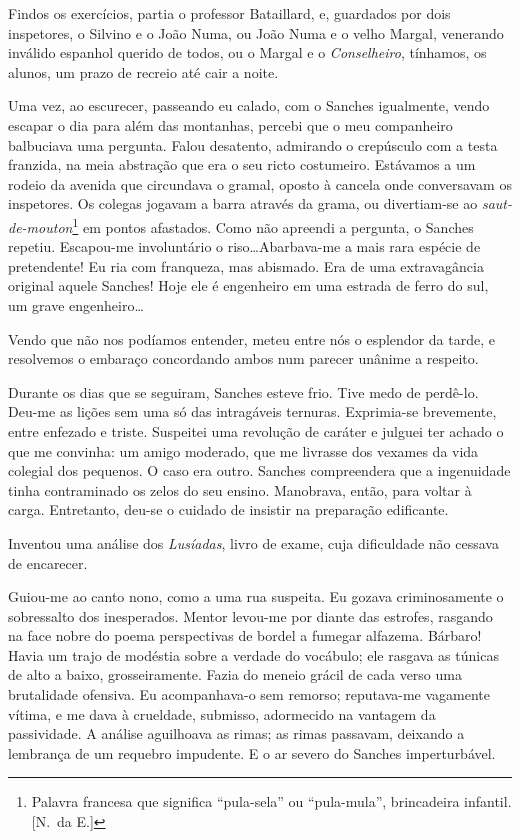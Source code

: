 Findos os exercícios, partia o professor
Bataillard, e, guardados por dois inspetores, o Silvino e o João Numa,
ou João Numa e o velho Margal, venerando inválido espanhol querido de
todos, ou o Margal e o \textit{Conselheiro}, tínhamos, os alunos, um prazo de
recreio até cair a noite. 

Uma vez, ao escurecer, passeando eu calado,
com o Sanches igualmente, vendo escapar o dia para além das montanhas,
percebi que o meu companheiro balbuciava uma pergunta. Falou desatento,
admirando o crepúsculo com a testa franzida, na meia abstração que era
o seu ricto costumeiro. Estávamos a um rodeio da avenida que circundava
o gramal, oposto à cancela onde conversavam os inspetores. Os colegas
jogavam a barra através da grama, ou divertiam{}-se ao
\textit{saut{}-de{}-mouton}\footnote{ Palavra francesa que significa 
``pula-sela'' ou ``pula-mula'', brincadeira infantil. [N.~da E.]} 
em pontos afastados. Como não apreendi a pergunta, o
Sanches repetiu. Escapou{}-me involuntário o riso\ldots Abarbava{}-me a
mais rara espécie de pretendente! Eu ria com franqueza, mas abismado.
Era de uma extravagância original aquele Sanches! Hoje ele é engenheiro
em uma estrada de ferro do sul, um grave engenheiro\ldots 

Vendo que não nos podíamos entender, meteu entre nós o esplendor da tarde, e
resolvemos o embaraço concordando ambos num parecer unânime a respeito.

Durante os dias que se seguiram, Sanches esteve frio. Tive medo de
perdê{}-lo. Deu{}-me as lições sem uma só das intragáveis ternuras.
Exprimia{}-se brevemente, entre enfezado e triste. Suspeitei uma
revolução de caráter e julguei ter achado o que me convinha: um amigo
moderado, que me livrasse dos vexames da vida colegial dos pequenos. O
caso era outro. Sanches compreendera que a ingenuidade tinha
contraminado os zelos do seu ensino. Manobrava, então, para voltar à
carga. Entretanto, deu{}-se o cuidado de insistir na preparação
edificante. 

Inventou uma análise dos \textit{Lusíadas}, livro de exame, cuja
dificuldade não cessava de encarecer. 

Guiou{}-me ao canto nono, como a
uma rua suspeita. Eu gozava criminosamente o sobressalto dos
inesperados. Mentor levou{}-me por diante das estrofes, rasgando na
face nobre do poema perspectivas de bordel a fumegar alfazema. Bárbaro!
Havia um trajo de modéstia sobre a verdade do vocábulo; ele rasgava as
túnicas de alto a baixo, grosseiramente. Fazia do meneio grácil de cada
verso uma brutalidade ofensiva. Eu acompanhava{}-o sem remorso;
reputava{}-me vagamente vítima, e me dava à crueldade, submisso,
adormecido na vantagem da passividade. A análise aguilhoava as rimas;
as rimas passavam, deixando a lembrança de um requebro impudente. E o
ar severo do Sanches imperturbável. 

